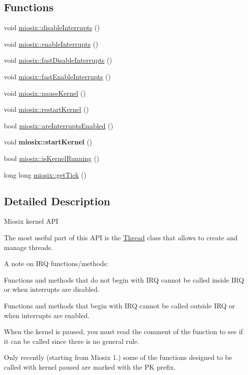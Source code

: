 \subsection*{Functions}
\begin{DoxyCompactItemize}
\item 
void \hyperlink{group___kernel_gacd7ef6e968c5c0b2ff45bf102388ea4d}{miosix\-::disable\-Interrupts} ()
\item 
void \hyperlink{group___kernel_ga36adaaa176d004747d2a01b822c9fea5}{miosix\-::enable\-Interrupts} ()
\item 
void \hyperlink{group___kernel_gaeeacb47660439066bb1d787593da9f4e}{miosix\-::fast\-Disable\-Interrupts} ()
\item 
void \hyperlink{group___kernel_ga882229b6c936a87454cb154a90751927}{miosix\-::fast\-Enable\-Interrupts} ()
\item 
void \hyperlink{group___kernel_ga730c9359f8069cb2f785501ea763eb43}{miosix\-::pause\-Kernel} ()
\item 
void \hyperlink{group___kernel_gad3bee49a8dd57a598b7d7aeeeaf8496c}{miosix\-::restart\-Kernel} ()
\item 
bool \hyperlink{group___kernel_gacabb0637ded36778470fa27eea329d84}{miosix\-::are\-Interrupts\-Enabled} ()
\item 
\hypertarget{group___kernel_ga0cad893a4c93263581e34dd3e0141649}{void {\bfseries miosix\-::start\-Kernel} ()}\label{group___kernel_ga0cad893a4c93263581e34dd3e0141649}

\item 
bool \hyperlink{group___kernel_gaabdbf06e8cf514d3113325a01927ccf5}{miosix\-::is\-Kernel\-Running} ()
\item 
long long \hyperlink{group___kernel_gad16c495ced6659e8bc0bb371362674ef}{miosix\-::get\-Tick} ()
\end{DoxyCompactItemize}


\subsection{Detailed Description}
Miosix kernel A\-P\-I

The most useful part of this A\-P\-I is the \hyperlink{classmiosix_1_1_thread}{Thread} class that allows to create and manage threads.

A note on I\-R\-Q functions/methods\-:\par
 Functions and methods that do not begin with I\-R\-Q cannot be called inside I\-R\-Q or when interrupts are disabled.\par
 Functions and methods that begin with I\-R\-Q cannot be called outside I\-R\-Q or when interrupts are enabled.\par
 When the kernel is paused, you must read the comment of the function to see if it can be called since there is no general rule.\par
 Only recently (starting from Miosix 1.) some of the functions designed to be called with kernel paused are marked with the P\-K prefix. 

